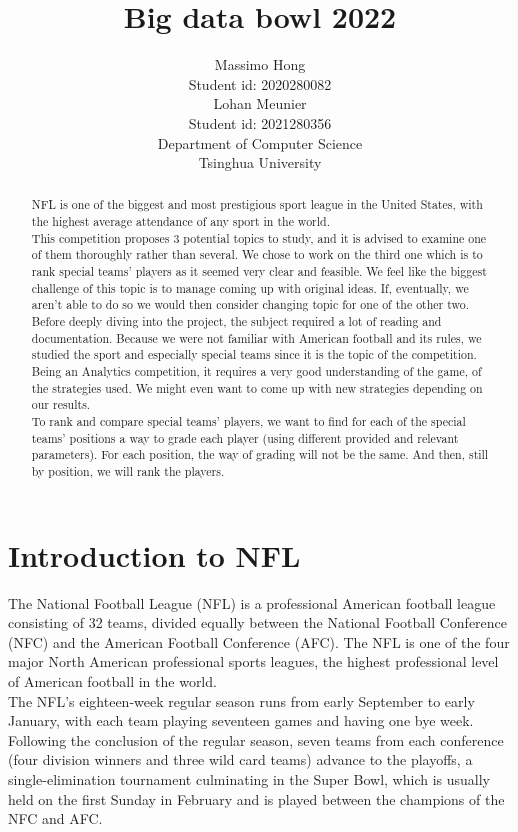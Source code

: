 \documentclass{article}
\title{Big data bowl 2022}
\author{
	Massimo Hong\\
	Student id: 2020280082\\
	Lohan Meunier\\
	Student id: 2021280356\\
	Department of Computer Science\\
	Tsinghua University\\
 }
\begin{document}
\maketitle

\begin{abstract}
  NFL is one of the biggest and most prestigious sport league in the United States, with the highest average attendance of any sport in the world. \\
This competition proposes 3 potential topics to study, and it is advised to examine one of them thoroughly rather than several. We chose to work on the third one which is to rank special teams’ players as it seemed very clear and feasible. We feel like the biggest challenge of this topic is to manage coming up with original ideas. If, eventually, we aren’t able to do so we would then consider changing topic for one of the other two.
Before deeply diving into the project, the subject required a lot of reading and documentation.
Because we were not familiar with American football and its rules, we studied the sport and especially special teams since it is the topic of the competition. Being an Analytics competition, it requires a very good understanding of the game, of the strategies used. We might even want to come up with new strategies depending on our results.\\
To rank and compare special teams’ players, we want to find for each of the special teams’ positions a way to grade each player (using different provided and relevant parameters). For each position, the way of grading will not be the same. And then, still by position, we will rank the players.
\end{abstract}
\section{Introduction to NFL}
The National Football League (NFL) is a professional American football league consisting of 32 teams, divided equally between the National Football Conference (NFC) and the American Football Conference (AFC). The NFL is one of the four major North American professional sports leagues, the highest professional level of American football in the world. \\
The NFL's eighteen-week regular season runs from early September to early January, with each team playing seventeen games and having one bye week. Following the conclusion of the regular season, seven teams from each conference (four division winners and three wild card teams) advance to the playoffs, a single-elimination tournament culminating in the Super Bowl, which is usually held on the first Sunday in February and is played between the champions of the NFC and AFC.
\end{document}
